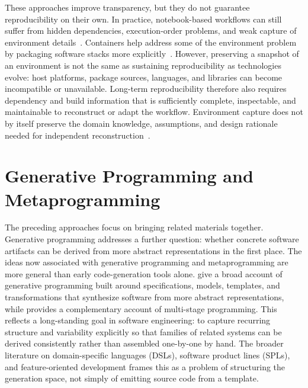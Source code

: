 These approaches improve transparency, but they do not guarantee
reproducibility on their own. In practice, notebook-based workflows can still
suffer from hidden dependencies, execution-order problems, and weak capture of
environment details~\citep{PimentelEtAl2019}. Containers help address some of
the environment problem by packaging software stacks more
explicitly~\citep{Canon2020}. However, preserving a snapshot of an environment
is not the same as sustaining reproducibility as technologies evolve: host
platforms, package sources, languages, and libraries can become incompatible
or unavailable. Long-term reproducibility therefore also requires dependency
and build information that is sufficiently complete, inspectable, and
maintainable to reconstruct or adapt the workflow. Environment capture does
not by itself preserve the domain knowledge, assumptions, and design rationale
needed for independent reconstruction~\citep{AkhlaghiEtAl2021}.


\section{Generative Programming and Metaprogramming}
\label{sec:bg_generative}

The preceding approaches focus on bringing related materials together.
Generative programming addresses a further question: whether concrete software
artifacts can be derived from more abstract representations in the first place.
The ideas now associated with generative programming and metaprogramming are
more general than early code-generation tools alone.
\citet{Czarnecki2000} give a broad account of generative programming built
around specifications, models, templates, and transformations that synthesize
software from more abstract representations, while \citet{Taha2004} provides a
complementary account of multi-stage programming.
This reflects a long-standing goal in software engineering: to capture
recurring structure and variability explicitly so that families of related
systems can be derived consistently rather than assembled one-by-one by hand.
The broader literature on domain-specific languages (DSLs), software product
lines (SPLs), and feature-oriented development frames this as a problem of
structuring the generation space, not simply of emitting source code from a
template.


